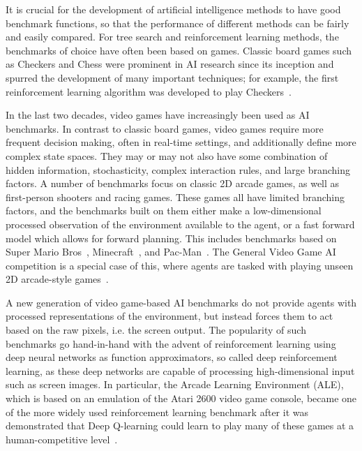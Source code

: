\documentclass{article}
\begin{document}
It is crucial for the development of artificial intelligence methods to have good benchmark functions, so that the performance of different methods can be fairly and easily compared. For tree search and reinforcement learning methods, the benchmarks of choice have often been based on games. Classic board games such as Checkers and Chess were prominent in AI research since its inception and spurred the development of many important techniques; for example, the first reinforcement learning algorithm was developed to play
Checkers~\cite{samuel1959some}. 


In the last two decades, video games have increasingly been used as AI benchmarks. In contrast to classic board games, video games require more frequent decision making, often in real-time settings, and additionally define more complex state spaces. They may or may not also have some combination of hidden information, stochasticity, complex interaction rules, and large branching factors. A number of benchmarks focus on classic 2D arcade games, as well as first-person shooters and racing games. These games all have limited branching factors, and the benchmarks built on them either make a low-dimensional processed observation of the environment available to the agent, or a fast forward model which allows for forward planning. This includes benchmarks based on Super Mario Bros~\cite{karakovskiy2012mario}, Minecraft~\cite{johnson2016malmo}, and Pac-Man~\cite{rohlfshagen2018pac}. The General Video Game AI competition is a special case of this, where agents are tasked with playing unseen 2D arcade-style games~\cite{perez2016general}.

A new generation of video game-based AI benchmarks do not provide agents with processed representations of the environment, but instead forces them to act based on the raw pixels, i.e. the screen output. The popularity of such benchmarks go hand-in-hand with the advent of reinforcement learning using deep neural networks as function approximators, so called deep reinforcement learning, as these deep networks are capable of processing high-dimensional input such as screen images. In particular, the Arcade Learning Environment (ALE), which is based on an emulation of the Atari 2600 video game console, became one of the more widely used reinforcement learning benchmark after it was demonstrated that Deep Q-learning could learn to play many of these games at a human-competitive level~\cite{bellemare2013arcade,mnih2015human}. 
\end{document}
